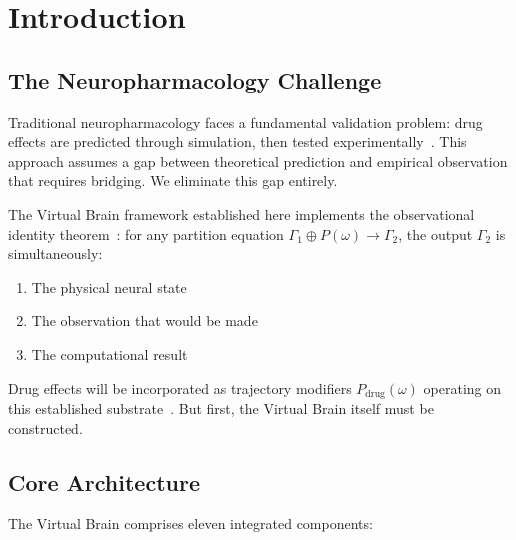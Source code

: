 \documentclass[aps,prd,twocolumn,superscriptaddress,floatfix,nofootinbib]{revtex4-2}
\theoremstyle{remark}
\newcommand{\Pop}{P}
\newcommand{\Gstate}{\Gamma}
\begin{document}
\maketitle

\section{Introduction}
\label{sec:introduction}

\subsection{The Neuropharmacology Challenge}

Traditional neuropharmacology faces a fundamental validation problem: drug effects are predicted through simulation, then tested experimentally~\cite{friston2010free}. This approach assumes a gap between theoretical prediction and empirical observation that requires bridging. We eliminate this gap entirely.

The Virtual Brain framework established here implements the observational identity theorem~\cite{sachikonye2024categorical,sachikonye2025observation}: for any partition equation $\Gstate_1 \oplus \Pop(\omega) \to \Gstate_2$, the output $\Gstate_2$ is simultaneously:
\begin{enumerate}
\item[(P)] The physical neural state
\item[(O)] The observation that would be made
\item[(C)] The computational result
\end{enumerate}

Drug effects will be incorporated as trajectory modifiers $\Pop_{\mathrm{drug}}(\omega)$ operating on this established substrate~\cite{sachikonye2024maxwell}. But first, the Virtual Brain itself must be constructed.

\subsection{Core Architecture}

The Virtual Brain comprises eleven integrated components:
\end{document}
